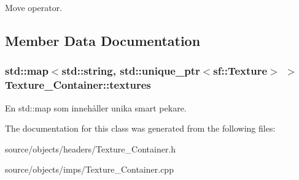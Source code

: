 Move operator. 



\subsection{Member Data Documentation}
\hypertarget{classTexture__Container_a2adf8e4fde3c21db9c92d99c77b1116a}{
\subsubsection[{textures}]{\setlength{\rightskip}{0pt plus 5cm}std\+::map$<$std\+::string, std\+::unique\+\_\+ptr$<$sf\+::\+Texture$>$ $>$ Texture\+\_\+\+Container\+::textures\hspace{0.3cm}{\ttfamily [private]}}}\label{classTexture__Container_a2adf8e4fde3c21db9c92d99c77b1116a}


En std\+::map som innehåller unika smart pekare. 



The documentation for this class was generated from the following files\+:\begin{DoxyCompactItemize}
\item 
source/objects/headers/Texture\+\_\+\+Container.\+h\item 
source/objects/imps/Texture\+\_\+\+Container.\+cpp\end{DoxyCompactItemize}
